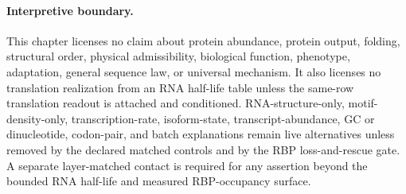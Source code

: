 \paragraph{Interpretive boundary.}
This chapter licenses no claim about protein abundance, protein output, folding, structural order, physical admissibility, biological function, phenotype, adaptation, general sequence law, or universal mechanism. It also licenses no translation realization from an RNA half-life table unless the same-row translation readout is attached and conditioned. RNA-structure-only, motif-density-only, transcription-rate, isoform-state, transcript-abundance, GC or dinucleotide, codon-pair, and batch explanations remain live alternatives unless removed by the declared matched controls and by the RBP loss-and-rescue gate. A separate layer-matched contact is required for any assertion beyond the bounded RNA half-life and measured RBP-occupancy surface.
